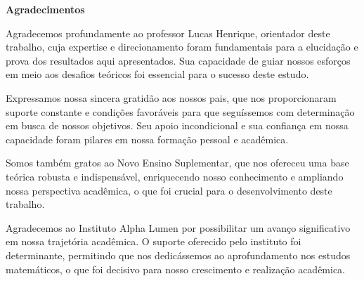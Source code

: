 \begin{center}
  \large \textbf{Agradecimentos}
\end{center}
\par Agradecemos profundamente ao professor Lucas Henrique, orientador deste trabalho, cuja expertise e direcionamento foram fundamentais para a elucidação e prova dos resultados aqui apresentados. Sua capacidade de guiar nossos esforços em meio aos desafios teóricos foi essencial para o sucesso deste estudo.

Expressamos nossa sincera gratidão aos nossos pais, que nos proporcionaram suporte constante e condições favoráveis para que seguíssemos com determinação em busca de nossos objetivos. Seu apoio incondicional e sua confiança em nossa capacidade foram pilares em nossa formação pessoal e acadêmica.

Somos também gratos ao Novo Ensino Suplementar, que nos ofereceu uma base teórica robusta e indispensável, enriquecendo nosso conhecimento e ampliando nossa perspectiva acadêmica, o que foi crucial para o desenvolvimento deste trabalho.

Agradecemos ao Instituto Alpha Lumen por possibilitar um avanço significativo em nossa trajetória acadêmica. O suporte oferecido pelo instituto foi determinante, permitindo que nos dedicássemos ao aprofundamento nos estudos matemáticos, o que foi decisivo para nosso crescimento e realização acadêmica.
